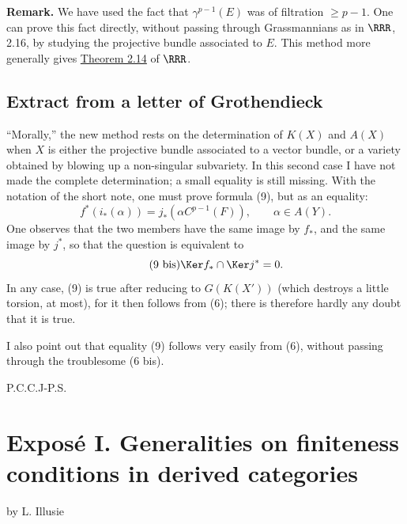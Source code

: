 \textbf{Remark.} We have used the fact that \(\gamma^{p-1}(E)\) was of filtration \(\geq p-1\). One can prove this fact directly, without passing through Grassmannians as in \(\RRR\), 2.16, by studying the projective bundle associated to \(E\). This method more generally gives \hyperlink{sga6.e00.thm.2-14}{Theorem 2.14} of \(\RRR\).

\subsection*{Extract from a letter of Grothendieck}
``Morally,'' the new method rests on the determination of \(K(X)\) and \(A(X)\) when \(X\) is either the projective bundle associated to a vector bundle, or a variety obtained by blowing up a non-singular subvariety. In this second case I have not made the complete determination; a small equality is still missing. With the notation of the short note, one must prove formula (9), but as an equality:
\begin{equation}\tag{9}
  f^*(i_*(\alpha))=j_*(\alpha C^{p-1}(F)),\qquad \alpha\in A(Y).
\end{equation}
One observes that the two members have the same image by \(f_*\), and the same image by \(j^*\), so that the question is equivalent to
\begin{equation}\tag{9 bis}
  \Ker f_*\cap\Ker j^*=0.
\end{equation}
In any case, (9) is true after reducing to \(G(K(X'))\) (which destroys a little torsion, at most), for it then follows from (6); there is therefore hardly any doubt that it is true.

I also point out that equality (9) follows very easily from (6), without passing through the troublesome (6 bis).

\begin{flushleft}
P.C.C.J-P.S.
\end{flushleft}

\newpage
{}\section*{Exposé I. Generalities on finiteness conditions in derived categories}
\begin{center}
by L. Illusie
\end{center}

